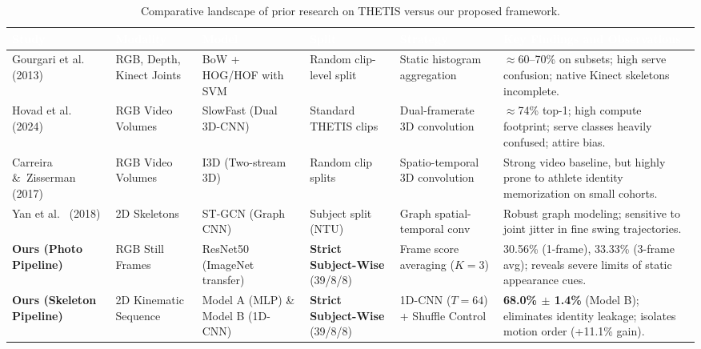\documentclass[12pt,a4paper]{article}
\begin{document}
\begin{table}[H]
\centering
\footnotesize
\setlength{\tabcolsep}{2.5pt}
\renewcommand{\arraystretch}{0.98}
\caption{Comparative landscape of prior research on THETIS versus our proposed framework.}
\label{tab:prior-work-comparison}
\begin{tabularx}{\textwidth}{L{2.1cm} L{1.7cm} L{1.9cm} L{1.8cm} L{1.9cm} Y}
\toprule
{}
\textcolor{white}{\textbf{Study}} & \textcolor{white}{\textbf{Modality}} & \textcolor{white}{\textbf{Model}} & \textcolor{white}{\textbf{Split}} & \textcolor{white}{\textbf{Strategy}} & \textcolor{white}{\textbf{Key Findings and Observations}} \\
\midrule
Gourgari et al.~\cite{gourgari2013thetis} (2013) & RGB, Depth, Kinect Joints & BoW + HOG/HOF with SVM & Random clip-level split & Static histogram aggregation & $\approx$60--70\% on subsets; high serve confusion; native Kinect skeletons incomplete. \\
Hovad et al.~\cite{hovad2024classification} (2024) & RGB Video Volumes & SlowFast (Dual 3D-CNN) & Standard THETIS clips & Dual-framerate 3D convolution & $\approx$74\% top-1; high compute footprint; serve classes heavily confused; attire bias. \\
Carreira \&\ Zisserman~\cite{carreira2017quo} (2017) & RGB Video Volumes & I3D (Two-stream 3D) & Random clip splits & Spatio-temporal 3D convolution & Strong video baseline, but highly prone to athlete identity memorization on small cohorts. \\
Yan et al.~\cite{yan2018spatial} (2018) & 2D Skeletons & ST-GCN (Graph CNN) & Subject split (NTU) & Graph spatial-temporal conv & Robust graph modeling; sensitive to joint jitter in fine swing trajectories. \\
\midrule
{}
\textbf{Ours (Photo Pipeline)} & RGB Still Frames & ResNet50 (ImageNet transfer) & \textbf{Strict Subject-Wise} (39/8/8) & Frame score averaging ($K=3$) & 30.56\% (1-frame), 33.33\% (3-frame avg); reveals severe limits of static appearance cues. \\
\textbf{Ours (Skeleton Pipeline)} & 2D Kinematic Sequence & Model A (MLP) \& Model B (1D-CNN) & \textbf{Strict Subject-Wise} (39/8/8) & 1D-CNN ($T=64$) + Shuffle Control & \textbf{68.0\% $\pm$ 1.4\%} (Model B); eliminates identity leakage; isolates motion order (+11.1\% gain). \\
\bottomrule
\end{tabularx}
\end{table}
\end{document}
